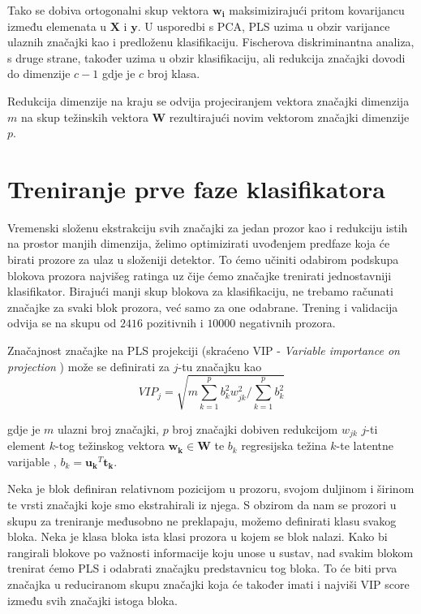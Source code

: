 \documentclass[seminar]{fer}
\begin{document}
Tako se dobiva ortogonalni skup vektora $\mathbf{w_i}$ maksimizirajući pritom kovarijancu između elemenata u $\mathbf{X}$ i $\mathbf{y}$. U usporedbi s PCA, PLS uzima u obzir varijance ulaznih značajki kao i predloženu klasifikaciju. Fischerova diskriminantna analiza, s druge strane, također uzima u obzir klasifikaciju, ali redukcija značajki dovodi do dimenzije $c - 1$ gdje je $c$ broj klasa. 

Redukcija dimenzije na kraju se odvija projeciranjem vektora značajki dimenzija $m$ na skup težinskih vektora $\mathbf{W}$ rezultirajući novim vektorom značajki dimenzije $p$.

\section{Treniranje prve faze klasifikatora}
Vremenski složenu ekstrakciju svih značajki za jedan prozor kao i redukciju istih na prostor manjih dimenzija, želimo optimizirati uvođenjem predfaze koja će birati prozore za ulaz u složeniji detektor. To ćemo učiniti odabirom podskupa blokova prozora najvišeg ratinga uz čije ćemo značajke trenirati jednostavniji klasifikator. Birajući manji skup blokova za klasifikaciju, ne trebamo  računati značajke za svaki blok prozora, već samo za one odabrane. Trening i validacija odvija se na skupu od $2416$ pozitivnih i $10000$ negativnih prozora.

Značajnost značajke na  PLS projekciji (skraćeno VIP - \emph{Variable importance on projection} ) \cite{VIP} može se definirati za $j$-tu značajku kao
\begin{equation*}
VIP_j = \sqrt{m \sum_{k = 1}^{p} b_k^2 w_{jk} ^ 2 / \sum_{k = 1}^{p} b_k ^2}
\end{equation*}

gdje je $m$ ulazni broj značajki, $p$ broj značajki dobiven redukcijom $w_{jk}$ $j$-ti element $k$-tog težinskog vektora $\mathbf{w_k} \in \mathbf{W}$ te $b_k$  regresijska težina  $k$-te latentne varijable \cite{PLS}, $b_k = \mathbf{u_k}^T \mathbf{t_k}$.

Neka je blok definiran relativnom pozicijom u prozoru, svojom duljinom i širinom te vrsti značajki koje smo ekstrahirali iz njega. S obzirom da nam se prozori u skupu za treniranje međusobno ne preklapaju, možemo definirati klasu svakog bloka. Neka je klasa bloka ista klasi prozora u kojem se blok nalazi. Kako bi rangirali blokove po važnosti informacije koju unose u sustav, nad svakim blokom trenirat ćemo PLS i odabrati značajku predstavnicu tog bloka. To će biti prva značajka u reduciranom skupu značajki koja će također imati i najviši VIP score između svih značajki istoga bloka.
\end{document}
